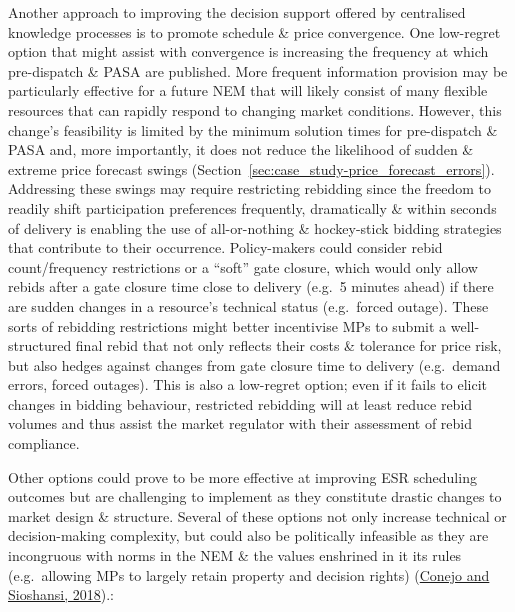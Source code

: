 \documentclass[12pt,a4paper,]{report}
\begin{document}
Another approach to improving the decision support offered by
centralised knowledge processes is to promote schedule \& price
convergence. One low-regret option that might assist with convergence is
increasing the frequency at which pre-dispatch \& PASA are published.
More frequent information provision may be particularly effective for a
future NEM that will likely consist of many flexible resources that can
rapidly respond to changing market conditions. However, this change's
feasibility is limited by the minimum solution times for pre-dispatch \&
PASA and, more importantly, it does not reduce the likelihood of sudden
\& extreme price forecast swings
(Section~\ref{sec:case_study-price_forecast_errors}). Addressing these
swings may require restricting rebidding since the freedom to readily
shift participation preferences frequently, dramatically \& within
seconds of delivery is enabling the use of all-or-nothing \&
hockey-stick bidding strategies that contribute to their occurrence.
Policy-makers could consider rebid count/frequency restrictions or a
``soft'' gate closure, which would only allow rebids after a gate
closure time close to delivery (e.g.~5 minutes ahead) if there are
sudden changes in a resource's technical status (e.g.~forced outage).
These sorts of rebidding restrictions might better incentivise MPs to
submit a well-structured final rebid that not only reflects their costs
\& tolerance for price risk, but also hedges against changes from gate
closure time to delivery (e.g.~demand errors, forced outages). This is
also a low-regret option; even if it fails to elicit changes in bidding
behaviour, restricted rebidding will at least reduce rebid volumes and
thus assist the market regulator with their assessment of rebid
compliance.

Other options could prove to be more effective at improving ESR
scheduling outcomes but are challenging to implement as they constitute
drastic changes to market design \& structure. Several of these options
not only increase technical or decision-making complexity, but could
also be politically infeasible as they are incongruous with norms in the
NEM \& the values enshrined in it its rules (e.g.~allowing MPs to
largely retain property and decision rights)
(\protect\hyperlink{ref-conejoRethinkingRestructuredElectricity2018}{Conejo
and Sioshansi, 2018}).:
\end{document}
